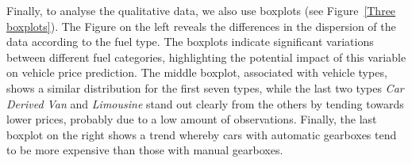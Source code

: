 \documentclass[12pt]{article}
\begin{document}
\noindent Finally, to analyse the qualitative data, we also use boxplots (see Figure~\ref{Three boxplots}). The Figure on the left reveals the differences in the dispersion of the data according to the fuel type. The boxplots indicate significant variations between different fuel categories, highlighting the potential impact of this variable on vehicle price prediction. 
The middle boxplot, associated with vehicle types, shows a similar distribution for the first seven types, while the last two types \textit{Car Derived Van} and \textit{Limousine} stand out clearly from the others by tending towards lower prices, probably due to a low amount of observations. 
Finally, the last boxplot on the right shows a trend whereby cars with automatic gearboxes tend to be more expensive than those with manual gearboxes. 

\FloatBarrier
\end{document}
